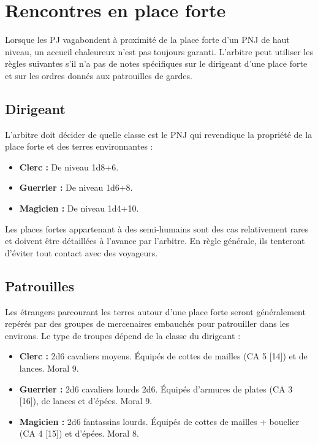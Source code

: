 \section{Rencontres en place forte}\label{rencontres-en-place-forte}

Lorsque les PJ vagabondent à proximité de la place forte d'un PNJ de
haut niveau, un accueil chaleureux n'est pas toujours garanti. L'arbitre
peut utiliser les règles suivantes s'il n'a pas de notes spécifiques sur
le dirigeant d'une place forte et sur les ordres donnés aux patrouilles
de gardes.

\subsection{Dirigeant}\label{dirigeant}

L'arbitre doit décider de quelle classe est le PNJ qui revendique la
propriété de la place forte et des terres environnantes :

\begin{itemize}
\item
  \textbf{Clerc :} De niveau 1d8+6.
\item
  \textbf{Guerrier :} De niveau 1d6+8.
\item
  \textbf{Magicien :} De niveau 1d4+10.
\end{itemize}

Les places fortes appartenant à des semi-humains sont des cas
relativement rares et doivent être détaillées à l'avance par l'arbitre.
En règle générale, ils tenteront d'éviter tout contact avec des
voyageurs.

\subsection{Patrouilles}\label{patrouilles}

Les étrangers parcourant les terres autour d'une place forte seront
généralement repérés par des groupes de mercenaires embauchés pour
patrouiller dans les environs. Le type de troupes dépend de la classe du
dirigeant :

\begin{itemize}
\item
  \textbf{Clerc :} 2d6 cavaliers moyens. Équipés de cottes de mailles
  (CA 5 {[}14{]}) et de lances. Moral 9.
\item
  \textbf{Guerrier :} 2d6 cavaliers lourds 2d6. Équipés d'armures de
  plates (CA 3 {[}16{]}), de lances et d'épées. Moral 9.
\item
  \textbf{Magicien :} 2d6 fantassins lourds. Équipés de cottes de
  mailles + bouclier (CA 4 {[}15{]}) et d'épées. Moral 8.
\end{itemize}

